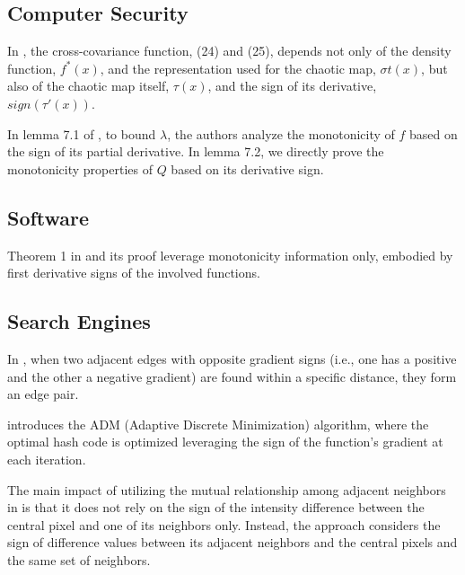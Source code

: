 \documentclass[11pt]{book}
\begin{document}

\subsection{Computer Security}

In \cite{cristea2008statistical}, the cross-covariance function,
(24) and (25), depends not only of the density function, $f^{\ast}(x)$,
and the representation used for the chaotic map, $\sigma t(x)$, but
also of the chaotic map itself, $\tau\left(x\right)$, and the sign
of its derivative, $sign\left(\tau'\left(x\right)\right)$.

In lemma 7.1 of \cite{ghazi2018resource}, to bound $\lambda$, the
authors analyze the monotonicity of $f$ based on the sign of its
partial derivative. In lemma 7.2, we directly prove the monotonicity
properties of $Q$ based on its derivative sign.


\subsection{Software}

Theorem 1 in \cite{okamura2013optimal} and its proof leverage monotonicity
information only, embodied by first derivative signs of the involved
functions.


\subsection{Search Engines}

In \cite{chang2005caption}, when two adjacent edges with opposite
gradient signs (i.e., one has a positive and the other a negative
gradient) are found within a specific distance, they form an edge
pair.

\cite{liu2017discretely} introduces the ADM (Adaptive Discrete Minimization)
algorithm, where the optimal hash code is optimized leveraging the
sign of the function's gradient at each iteration.

The main impact of utilizing the mutual relationship among adjacent
neighbors in \cite{banerjee2018local} is that it does not rely on
the sign of the intensity difference between the central pixel and
one of its neighbors only. Instead, the approach considers the sign
of difference values between its adjacent neighbors and the central
pixels and the same set of neighbors.
\end{document}
